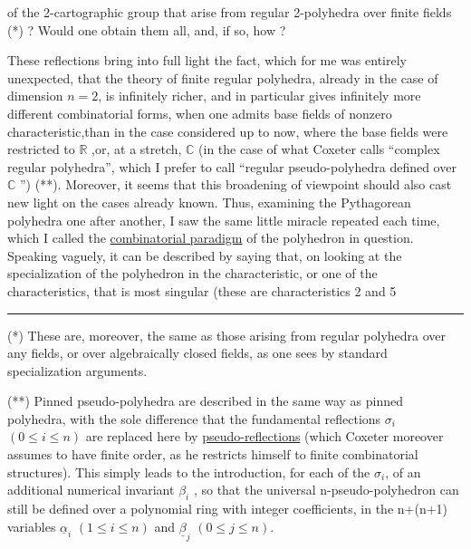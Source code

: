 
of the 2-cartographic group that arise from regular 2-polyhedra
over finite fields (*) ? Would one obtain them all,
and, if so, how ?

These reflections bring into full light the fact,
which for me was entirely unexpected, that the theory of
finite regular polyhedra, already in the case of dimension
$n = 2$, is infinitely richer, and in particular gives infinitely
more different combinatorial forms, when one admits
base fields of nonzero characteristic,\quad than in the
case considered up to now, where the base fields were restricted
to $\mathbb{R}$ ,or, at a stretch, $\mathbb{C}$ (in the case of what Coxeter
calls ``complex regular polyhedra'', which I prefer
to call ``regular pseudo-polyhedra defined over $\mathbb{C}$ '') (**). Moreover,
it seems that this broadening of viewpoint should also cast
new light on the cases already known. Thus, examining the
Pythagorean polyhedra one after another, I saw
the same little miracle repeated each time, which I called the \uline{combinatorial
paradigm} of the polyhedron in question. Speaking vaguely, it can be
described by saying that, on looking at the specialization of the polyhedron
in the characteristic, or one of the characteristics, that is
most singular (these are characteristics 2 and 5

\rule{5cm}{0.4pt}

(*) These are, moreover, the same as those arising from regular
polyhedra over any fields, or over algebraically closed fields, as
one sees by standard specialization arguments.

(**) Pinned pseudo-polyhedra are described in the same way as
pinned polyhedra, with the sole difference that the fundamental
reflections $\sigma_i$ $(0 \leq i \leq n)$ are replaced here by \uline{pseudo-reflections}
(which Coxeter moreover assumes to have finite order, as he
restricts himself to finite combinatorial structures). This simply leads
to the introduction, for each of the $\sigma_i$, of an additional numerical
invariant $\beta_i$ , so that the universal n-pseudo-polyhedron can still be
defined over a polynomial ring with integer coefficients, in
the n+(n+1) variables $\underline{\alpha}_i$ $(1 \leq i \leq n)$ and $\underline{\beta}_j$ $(0 \leq j \leq n)$.


